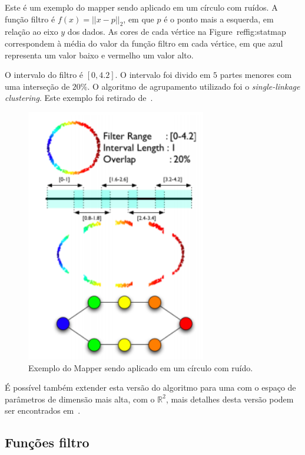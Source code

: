 \begin{ex}
    Este é um exemplo do mapper sendo aplicado em um círculo com ruídos. A função filtro
    é $f(x) = || x - p ||_2$, em que $p$ é o ponto mais a esquerda, em relação ao eixo $y$
    dos dados. As cores de cada vértice na Figure~ref{fig:statmap} correspondem à média
    do valor da função filtro em cada vértice, em que azul representa um valor baixo e 
    vermelho um valor alto. 

    O intervalo do filtro é $[0,4.2]$. O intervalo foi divido em $5$ partes menores com uma
    interseção de $20\%$. O algoritmo de agrupamento utilizado foi o \textit{single-linkage
    clustering}. Este exemplo foi retirado de~\cite{mapper}. 
    \begin{figure}
        \centering
        \includegraphics[width=0.7\textwidth]{images/statmap.png}
        \caption{Exemplo do Mapper sendo aplicado em um círculo com ruído.}
        \label{fig:statmap}
    \end{figure}
\end{ex} 

É possível também extender esta versão do algoritmo para uma com o espaço de parâmetros de dimensão
mais alta, com o $\mathbb{R}^2$, mais detalhes desta versão podem ser encontrados em~\cite{mapper}.

\subsection{Funções filtro}

